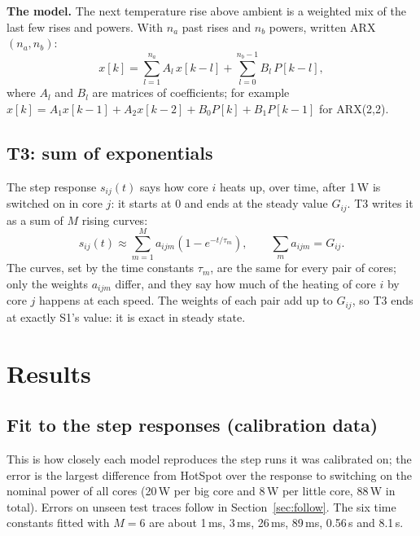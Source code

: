 \documentclass[11pt,a4paper]{article}
\begin{document}
\textbf{The model.} The next temperature rise above ambient is a weighted mix of the last few rises
and powers. With $n_a$ past rises and $n_b$ powers, written ARX$(n_a, n_b)$:
\begin{equation}
  x[k] = \sum_{l=1}^{n_a} A_l\, x[k-l] + \sum_{l=0}^{n_b-1} B_l\, P[k-l],
  \label{eq:arx}
\end{equation}
where $A_l$ and $B_l$ are matrices of coefficients; for example $x[k] = A_1 x[k-1] + A_2 x[k-2] + B_0 P[k] + B_1 P[k-1]$ for ARX(2,2).

\subsection{T3: sum of exponentials}\label{sec:t3}
The step response $s_{ij}(t)$ says how core $i$ heats up, over time, after 1\,W is switched on in
core $j$: it starts at 0 and ends at the steady value $G_{ij}$. T3 writes it as a sum of $M$ rising
curves:
\begin{equation}
  s_{ij}(t) \approx \sum_{m=1}^{M} a_{ijm}\left(1 - e^{-t/\tau_m}\right),
  \qquad \sum_m a_{ijm} = G_{ij}.
  \label{eq:t3}
\end{equation}
The curves, set by the time constants $\tau_m$, are the same for every pair of cores; only the
weights $a_{ijm}$ differ, and they say how much of the heating of core $i$ by core $j$ happens at
each speed. The weights of each pair add up to $G_{ij}$, so T3 ends at exactly S1's value: it is
exact in steady state.

\section{Results}\label{sec:results}

\subsection{Fit to the step responses (calibration data)}
This is how closely each model reproduces the step runs it was calibrated on; the error is the
largest difference from HotSpot over the response to switching on the nominal power of all cores
(20\,W per big core and 8\,W per little core, 88\,W in total). Errors on unseen test traces follow
in Section~\ref{sec:follow}. The six time constants fitted with $M = 6$ are about 1\,ms, 3\,ms,
26\,ms, 89\,ms, 0.56\,s and 8.1\,s.
\end{document}
